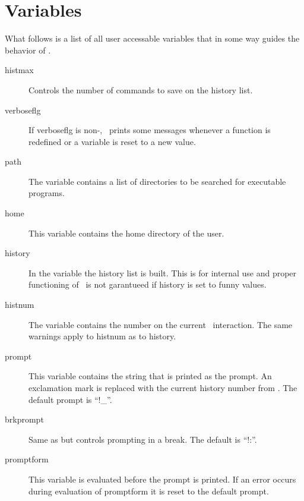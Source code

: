 \section{Variables}
What follows is a list of all user accessable variables that in some
way guides the behavior of \lips.
\begin{description}
\item[histmax] Controls the number of commands to save on the history
  list.
\item[verboseflg] If verboseflg is non-\NIL, \lips\ prints some
  messages whenever a function is redefined or a variable is reset to
  a new value.
\item[path] The  variable contains a list of directories to
  be searched for executable programs.
\item[home] This variable contains the home directory of the user.
\item[history] In the  variable the history list is
  built.  This is for internal use and proper functioning of \lips\ is
  not garantueed if history is set to funny values.
\item[histnum] The variable  contains the number on the
  current \lips\ interaction.  The same warnings apply to histnum as
  to history.
\item[prompt] This variable contains the string that is printed as the
  prompt.  An exclamation mark is replaced with the current history
  number from .  The default prompt is ``!\_''.
\item[brkprompt] Same as  but controls prompting in a break.
  The default is ``!:''.
\item[promptform] This variable is evaluated before the prompt is
  printed.  If an error occurs during evaluation of promptform it is
  reset to the default prompt.
\end{description}
